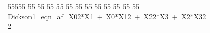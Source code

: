 %
%
\begin{tabbing}
55555 \= 55 \= 55 \= 55 \= 55 \= 55 \= 55 \= 55 \= 55 \= 55 \= 55 \= 55 \= 55 \= \>Dickson1\_eqn\_af=X02*X1\ +\ X0*X12\ +\ X22*X3\ +\ X2*X32\\[0pt]
2\>\end{tabbing}

